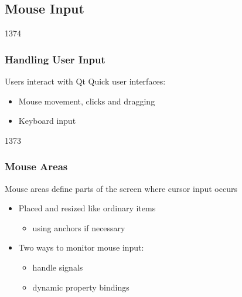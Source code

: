 %
%
%
%

\subsection{Mouse Input}

\begin{slide}{1374}\frametitle{Handling User Input}

Users interact with Qt Quick user interfaces:

\begin{itemize}
\item Mouse movement, clicks and dragging
\item Keyboard input
\end{itemize}

\end{slide}
                      

\begin{slide}{1373}\frametitle{Mouse Areas}

Mouse areas define parts of the screen where cursor input occurs

\begin{itemize}
\item Placed and resized like ordinary items
  \begin{itemize}
  \item using anchors if necessary
  \end{itemize}
\item Two ways to monitor mouse input:
  \begin{itemize}
  \item handle signals
  \item dynamic property bindings
  \end{itemize}
\end{itemize}


\end{slide}

